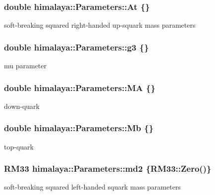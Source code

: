\subsubsection[{\texorpdfstring{At}{At}}]{\setlength{\rightskip}{0pt plus 5cm}double himalaya\+::\+Parameters\+::\+At \{\}}\hypertarget{structhimalaya_1_1Parameters_a8843e5d6997fcf2af27eed6a18e86631}{}\label{structhimalaya_1_1Parameters_a8843e5d6997fcf2af27eed6a18e86631}
soft-\/breaking squared right-\/handed up-\/squark mass parameters 
\subsubsection[{\texorpdfstring{g3}{g3}}]{\setlength{\rightskip}{0pt plus 5cm}double himalaya\+::\+Parameters\+::g3 \{\}}\hypertarget{structhimalaya_1_1Parameters_a728fe0a5f7e390f3f165fbc536002296}{}\label{structhimalaya_1_1Parameters_a728fe0a5f7e390f3f165fbc536002296}
mu parameter 
\subsubsection[{\texorpdfstring{MA}{MA}}]{\setlength{\rightskip}{0pt plus 5cm}double himalaya\+::\+Parameters\+::\+MA \{\}}\hypertarget{structhimalaya_1_1Parameters_a8cd4adb5c71cd896e95f4e4873e1a125}{}\label{structhimalaya_1_1Parameters_a8cd4adb5c71cd896e95f4e4873e1a125}
down-\/quark 
\subsubsection[{\texorpdfstring{Mb}{Mb}}]{\setlength{\rightskip}{0pt plus 5cm}double himalaya\+::\+Parameters\+::\+Mb \{\}}\hypertarget{structhimalaya_1_1Parameters_aa2e33485d4234974d0a93af49ea5df7d}{}\label{structhimalaya_1_1Parameters_aa2e33485d4234974d0a93af49ea5df7d}
top-\/quark 
\subsubsection[{\texorpdfstring{md2}{md2}}]{\setlength{\rightskip}{0pt plus 5cm}R\+M33 himalaya\+::\+Parameters\+::md2 \{R\+M33\+::\+Zero()\}}\hypertarget{structhimalaya_1_1Parameters_a816c90360f6140e1f9c147efcdbe7ac2}{}\label{structhimalaya_1_1Parameters_a816c90360f6140e1f9c147efcdbe7ac2}
soft-\/breaking squared left-\/handed squark mass parameters 
